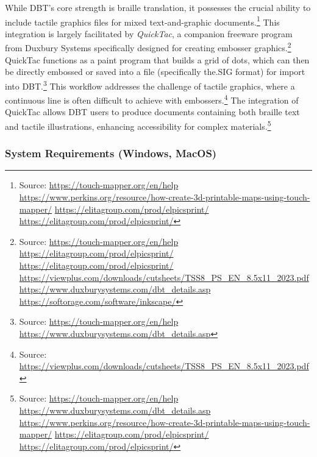 While DBT's core strength is braille translation, it possesses the crucial ability to include tactile graphics files for mixed text-and-graphic documents.\footnote{Source:  \url{https://touch-mapper.org/en/help} \url{https://www.perkins.org/resource/how-create-3d-printable-maps-using-touch-mapper/} \url{https://elitagroup.com/prod/elpicsprint/} \url{https://elitagroup.com/prod/elpicsprint/}} This integration is largely facilitated by \emph{QuickTac}, a companion freeware program from Duxbury Systems specifically designed for creating embosser graphics.\footnote{Source:  \url{https://touch-mapper.org/en/help} \url{https://elitagroup.com/prod/elpicsprint/} \url{https://elitagroup.com/prod/elpicsprint/} \url{https://viewplus.com/downloads/cutsheets/TSS8_PS_EN_8.5x11_2023.pdf} \url{https://www.duxburysystems.com/dbt_details.asp} \url{https://softorage.com/software/inkscape/}} QuickTac functions as a paint program that builds a grid of dots, which can then be directly embossed or saved into a file (specifically the.SIG format) for import into DBT.\footnote{Source:  \url{https://touch-mapper.org/en/help} \url{https://www.duxburysystems.com/dbt_details.asp}} This workflow addresses the challenge of tactile graphics, where a continuous line is often difficult to achieve with embossers.\footnote{Source:  \url{https://viewplus.com/downloads/cutsheets/TSS8_PS_EN_8.5x11_2023.pdf}} The integration of QuickTac allows DBT users to produce documents containing both braille text and tactile illustrations, enhancing accessibility for complex materials.\footnote{Source:  \url{https://touch-mapper.org/en/help} \url{https://www.duxburysystems.com/dbt_details.asp} \url{https://www.perkins.org/resource/how-create-3d-printable-maps-using-touch-mapper/} \url{https://elitagroup.com/prod/elpicsprint/} \url{https://elitagroup.com/prod/elpicsprint/}}

\subsubsection{System Requirements (Windows, MacOS)}

